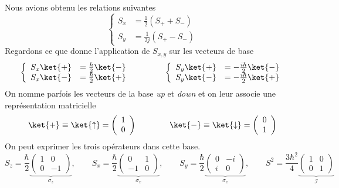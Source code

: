 	Nous avions obtenu les relations suivantes	
	\begin{equation}
	\left\{\begin{array}{ll}
	S_x &= \frac{1}{2}(S_++S_-)\\
	S_y &= \frac{1}{2j}(S_+-S_-)	
	\end{array}\right.
	\end{equation}
	Regardons ce que donne l'application de $S_{x,y}$ sur les vecteurs de base
	\begin{equation}
	\left\{\begin{array}{ll}
	S_x\ket{+} &= \frac{\hbar}{2}\ket{-}\\
	S_x\ket{-} &= \frac{\hbar}{2}\ket{+}	
	\end{array}\right.\qquad\qquad\left\{\begin{array}{ll}
	S_y\ket{+} &= -\frac{i\hbar}{2}\ket{-}\\
	S_y\ket{-} &= -\frac{i\hbar}{2}\ket{+}	
	\end{array}\right.
	\end{equation}
	On nomme parfois les vecteurs de la base \textit{up} et \textit{down} et on leur associe 
	une représentation matricielle
	\begin{equation}
	\ket{+} \equiv \ket{\uparrow} = \left(\begin{array}{c}
	1\\
	0
	\end{array}\right)\qquad\qquad\ket{-} \equiv \ket{\downarrow} = \left(\begin{array}{c}
	0\\
	1
	\end{array}\right)
	\end{equation}
	On peut exprimer les trois opérateurs dans cette base. 
	\begin{equation}
	S_z = \dfrac{\hbar}{2}\underbrace{\left(\begin{array}{cc}
	1 & 0\\
	0 & -1
	\end{array}\right)}_{\sigma_z},\qquad S_x = \dfrac{\hbar}{2}\underbrace{\left(\begin{array}{cc}
	0 & 1\\
	-1 & 0
	\end{array}\right)}_{\sigma_x},\qquad S_y = \dfrac{\hbar}{2}\underbrace{\left(\begin{array}{cc}
	0 & -i\\
	i & 0
	\end{array}\right)}_{\sigma_z},\qquad S^2  = \dfrac{3\hbar^2}{4}\underbrace{\left(\begin{array}{cc}
	1 & 0\\
	0 & 1
	\end{array}\right)}_{\mathcal{I}}
	\end{equation}
